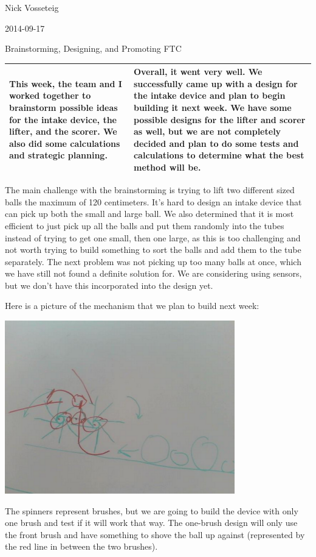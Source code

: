 Nick Vosseteig

2014-09-17

Brainstorming, Designing, and Promoting FTC

\begin{tabular}{|p{5cm}|p{5cm}|}
 \hline
This week, the team and I worked together to brainstorm possible ideas for the intake device, the lifter, and the scorer. We also did some calculations and strategic planning. &
Overall, it went very well. We successfully came up with a design for the intake device and plan to begin building it next week. We have some possible designs for the lifter and scorer as well, but we are not completely decided and plan to do some tests and calculations to determine what the best method will be.
 \\
 \hline
\end{tabular}

The main challenge with the brainstorming is trying to lift two different sized balls the maximum of 120 centimeters. It’s hard to design an intake device that can pick up both the small and large ball. We also determined that it is most efficient to just pick up all the balls and put them randomly into the tubes instead of trying to get one small, then one large, as this is too challenging and not worth trying to build something to sort the balls and add them to the tube separately. The next problem was not picking up too many balls at once, which we have still not found a definite solution for. We are considering using sensors, but we don’t have this incorporated into the design yet. 

Here is a picture of the mechanism that we plan to build next week:
\begin{center}
 \includegraphics[width=10cm]{./Entries/Images/intake_device.png}
\end{center}
The spinners represent brushes, but we are going to build the device with only one brush and test if it will work that way. The one-brush design will only use the front brush and have something to shove the ball up against (represented by the red line in between the two brushes).
